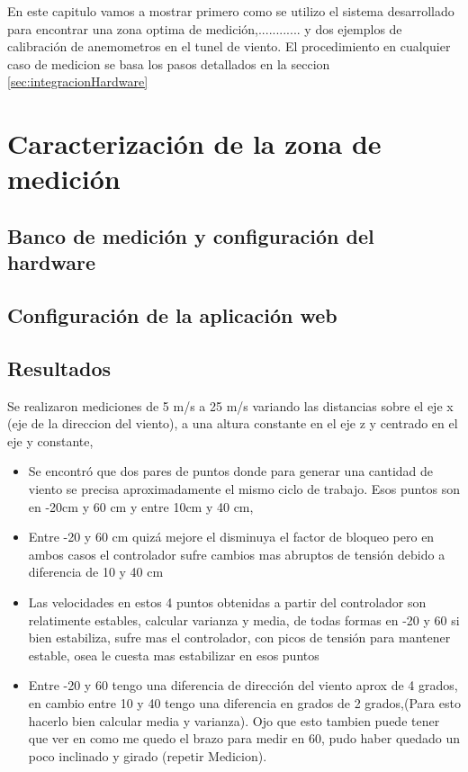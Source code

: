 En este capitulo vamos a mostrar primero como se utilizo el sistema desarrollado para encontrar una zona optima de medición,............ y dos ejemplos de calibración de anemometros en el tunel de viento. El procedimiento en cualquier caso de medicion se basa los pasos detallados en la seccion \ref{sec:integracionHardware}
\section{Caracterización de la zona de medición}\label{sec:caracterZonaMed}
\subsection{Banco de medición y configuración del hardware}
\subsection{Configuración de la aplicación web}
\subsection{Resultados}


Se realizaron mediciones de 5 m/s a 25 m/s variando las distancias sobre el eje x (eje de la direccion del viento), a una altura constante en el eje z y centrado en el eje y constante, 

\begin{itemize}
    \item Se encontró que dos pares de puntos donde para generar una cantidad de viento se precisa aproximadamente el mismo ciclo de trabajo. Esos puntos son en -20cm y 60 cm y entre 10cm y 40 cm, 
    \item Entre -20 y 60 cm quizá mejore el disminuya el factor de bloqueo pero en ambos casos el controlador sufre cambios mas abruptos de tensión debido a diferencia de 10 y 40 cm
    \item Las velocidades en estos 4 puntos obtenidas a partir del controlador son relatimente estables, calcular varianza y media, de todas formas en -20 y 60 si bien estabiliza, sufre mas el controlador, con picos de tensión para mantener estable, osea le cuesta mas estabilizar en esos puntos
    \item Entre -20 y 60 tengo una diferencia de dirección del  viento aprox de  4 grados, en cambio entre 10 y 40 tengo una diferencia en grados de 2 grados,(Para esto hacerlo bien calcular media y varianza). Ojo que esto tambien puede tener que ver en como me quedo el brazo para medir en 60, pudo haber quedado un poco inclinado y girado (repetir Medicion).
\end{itemize}

